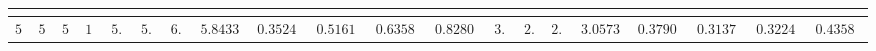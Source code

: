 \begin{table}[!tbp]
\begin{center}
\begin{tabular}{rrrrrrrrrrrrrrrrrrrr}
\hline\hline
\multicolumn{1}{c}{}&\multicolumn{1}{c}{}&\multicolumn{1}{c}{}&\multicolumn{1}{c}{}&\multicolumn{1}{c}{}&\multicolumn{1}{c}{}&\multicolumn{1}{c}{}&\multicolumn{1}{c}{}&\multicolumn{1}{c}{}&\multicolumn{1}{c}{}&\multicolumn{1}{c}{}&\multicolumn{1}{c}{}&\multicolumn{1}{c}{}&\multicolumn{1}{c}{}&\multicolumn{1}{c}{}&\multicolumn{1}{c}{}&\multicolumn{1}{c}{}&\multicolumn{1}{c}{}&\multicolumn{1}{c}{}&\multicolumn{1}{c}{}\tabularnewline
\hline
$50$&$50$&$50$&$150$&$5.006$&$5.936$&$6.588$&$5.84333333333333$&$0.352489687213451$&$0.516171147063863$&$0.635879593274432$&$0.828066127977863$&$3.428$&$2.77$&$2.974$&$3.05733333333333$&$0.379064369096289$&$0.313798323378411$&$0.322496638172637$&$0.435866284936698$\tabularnewline
\hline
\end{tabular}\end{center}
\end{table}

